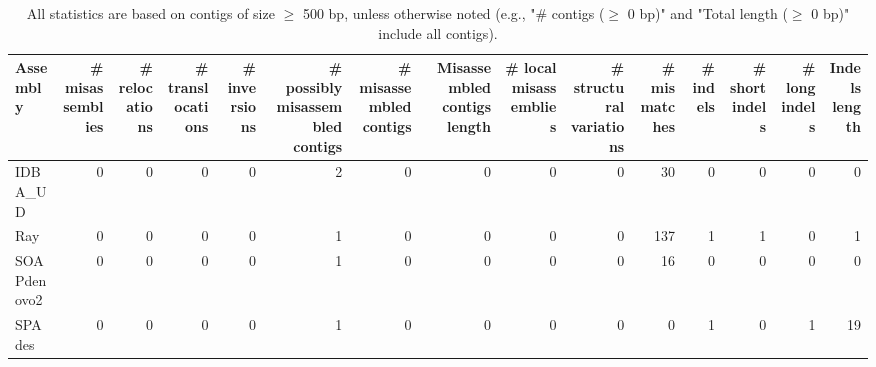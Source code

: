 \documentclass[12pt,a4paper]{article}
\begin{document}
\begin{table}[ht]
\begin{center}
\caption{All statistics are based on contigs of size $\geq$ 500 bp, unless otherwise noted (e.g., "\# contigs ($\geq$ 0 bp)" and "Total length ($\geq$ 0 bp)" include all contigs).}
\begin{tabular}{|l*{14}{|r}|}
\hline
Assembly & \# misassemblies &     \# relocations &     \# translocations &     \# inversions & \# possibly misassembled contigs & \# misassembled contigs & Misassembled contigs length & \# local misassemblies & \# structural variations & \# mismatches & \# indels &     \# short indels &     \# long indels & Indels length \\ \hline
IDBA\_UD & 0 & 0 & 0 & 0 & 2 & 0 & 0 & 0 & 0 & 30 & 0 & 0 & 0 & 0 \\ \hline
Ray & 0 & 0 & 0 & 0 & 1 & 0 & 0 & 0 & 0 & 137 & 1 & 1 & 0 & 1 \\ \hline
SOAPdenovo2 & 0 & 0 & 0 & 0 & 1 & 0 & 0 & 0 & 0 & 16 & 0 & 0 & 0 & 0 \\ \hline
SPAdes & 0 & 0 & 0 & 0 & 1 & 0 & 0 & 0 & 0 & 0 & 1 & 0 & 1 & 19 \\ \hline
\end{tabular}
\end{center}
\end{table}
\end{document}
